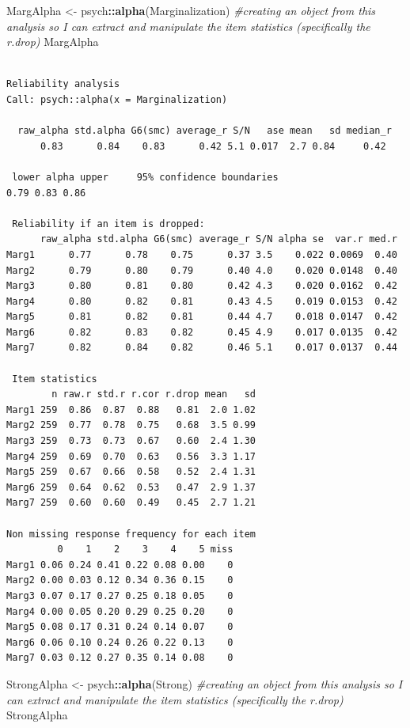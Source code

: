 \documentclass[
  english,
]{book}
\newenvironment{Shaded}{\begin{snugshade}}{\end{snugshade}}
\newcommand{\CommentTok}[1]{\textcolor[rgb]{0.56,0.35,0.01}{\textit{#1}}}
\newcommand{\KeywordTok}[1]{\textcolor[rgb]{0.13,0.29,0.53}{\textbf{#1}}}
\newcommand{\NormalTok}[1]{#1}
\newcommand{\OperatorTok}[1]{\textcolor[rgb]{0.81,0.36,0.00}{\textbf{#1}}}
\newcommand{\StringTok}[1]{\textcolor[rgb]{0.31,0.60,0.02}{#1}}
\begin{document}
\begin{Shaded}
\begin{Highlighting}[]
\NormalTok{MargAlpha <-}\StringTok{ }\NormalTok{psych}\OperatorTok{::}\KeywordTok{alpha}\NormalTok{(Marginalization) }\CommentTok{#creating an object from this analysis so I can extract and manipulate the item statistics (specifically the r.drop)}
\NormalTok{MargAlpha}
\end{Highlighting}
\end{Shaded}

\begin{verbatim}

Reliability analysis   
Call: psych::alpha(x = Marginalization)

  raw_alpha std.alpha G6(smc) average_r S/N   ase mean   sd median_r
      0.83      0.84    0.83      0.42 5.1 0.017  2.7 0.84     0.42

 lower alpha upper     95% confidence boundaries
0.79 0.83 0.86 

 Reliability if an item is dropped:
      raw_alpha std.alpha G6(smc) average_r S/N alpha se  var.r med.r
Marg1      0.77      0.78    0.75      0.37 3.5    0.022 0.0069  0.40
Marg2      0.79      0.80    0.79      0.40 4.0    0.020 0.0148  0.40
Marg3      0.80      0.81    0.80      0.42 4.3    0.020 0.0162  0.42
Marg4      0.80      0.82    0.81      0.43 4.5    0.019 0.0153  0.42
Marg5      0.81      0.82    0.81      0.44 4.7    0.018 0.0147  0.42
Marg6      0.82      0.83    0.82      0.45 4.9    0.017 0.0135  0.42
Marg7      0.82      0.84    0.82      0.46 5.1    0.017 0.0137  0.44

 Item statistics 
        n raw.r std.r r.cor r.drop mean   sd
Marg1 259  0.86  0.87  0.88   0.81  2.0 1.02
Marg2 259  0.77  0.78  0.75   0.68  3.5 0.99
Marg3 259  0.73  0.73  0.67   0.60  2.4 1.30
Marg4 259  0.69  0.70  0.63   0.56  3.3 1.17
Marg5 259  0.67  0.66  0.58   0.52  2.4 1.31
Marg6 259  0.64  0.62  0.53   0.47  2.9 1.37
Marg7 259  0.60  0.60  0.49   0.45  2.7 1.21

Non missing response frequency for each item
         0    1    2    3    4    5 miss
Marg1 0.06 0.24 0.41 0.22 0.08 0.00    0
Marg2 0.00 0.03 0.12 0.34 0.36 0.15    0
Marg3 0.07 0.17 0.27 0.25 0.18 0.05    0
Marg4 0.00 0.05 0.20 0.29 0.25 0.20    0
Marg5 0.08 0.17 0.31 0.24 0.14 0.07    0
Marg6 0.06 0.10 0.24 0.26 0.22 0.13    0
Marg7 0.03 0.12 0.27 0.35 0.14 0.08    0
\end{verbatim}

\begin{Shaded}
\begin{Highlighting}[]
\NormalTok{StrongAlpha <-}\StringTok{ }\NormalTok{psych}\OperatorTok{::}\KeywordTok{alpha}\NormalTok{(Strong) }\CommentTok{#creating an object from this analysis so I can extract and manipulate the item statistics (specifically the r.drop)}
\NormalTok{StrongAlpha}
\end{Highlighting}
\end{Shaded}
\end{document}
